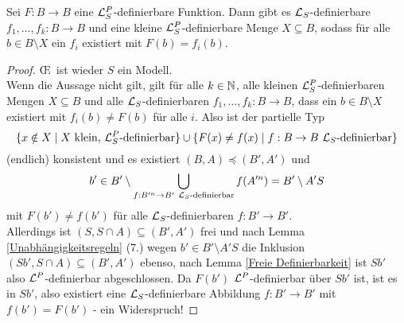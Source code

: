 \begin{lemma}
	Sei $F:B\rightarrow B$ eine $\mathcal{L}^P_S$-definierbare Funktion. Dann gibt es $\mathcal{L}_S$-definierbare $f_1,\dots,f_k:B\rightarrow B$ und eine kleine $\mathcal{L}^P_S$-definierbare Menge $X\subseteq B$, sodass für alle $b\in B\setminus X$ ein $f_i$ existiert mit $F(b)=f_i(b)$.
\end{lemma}
\begin{proof}
	\OE\ ist wieder $S$ ein Modell.\\
	Wenn die Aussage nicht gilt, gilt für alle $k\in\mathbb{N}$, alle kleinen $\mathcal{L}^P_S$-definierbaren Mengen $X\subseteq B$ und alle $\mathcal{L}_S$-definierbaren $f_1,\dots,f_k:B\rightarrow B$, dass ein $b\in B\setminus X$ existiert mit $f_i(b)\neq F(b)$ für alle $i$. Also ist der partielle Typ $$\{x\notin X\mid X\text{ klein, }\mathcal{L}^P_S\text{-definierbar}\}\cup\{F(x)\neq f(x)\mid f:B\rightarrow B\ \mathcal{L}_S\text{-definierbar}\}$$ (endlich) konsistent und es existiert $(B,A)\preceq(B',A')$ und $$b'\in B'\setminus\bigcup\limits_{f:B'^n\rightarrow B'\ \lingua_S\text{-definierbar}}f(A'^n)=B'\setminus A'S$$ mit $F(b')\neq f(b')$ für alle $\mathcal{L}_S$-definierbaren $f:B'\rightarrow B'$.\\
	Allerdings ist $(S,S\cap A)\subseteq(B',A')$ frei und nach Lemma \ref{Unabhängigkeitsregeln} (7.) wegen $b'\in B'\setminus A'S$ die Inklusion $(Sb',S\cap A)\subseteq(B',A')$ ebenso, nach Lemma \ref{Freie Definierbarkeit} ist $Sb'$ also $\mathcal{L}^P$-definierbar abgeschlossen. Da $F(b')$ $\mathcal{L}^P$-definierbar über $Sb'$ ist, ist es in $Sb'$, also existiert eine $\mathcal{L}_S$-definierbare Abbildung $f:B'\rightarrow B'$ mit $f(b')=F(b')$ - ein Widerspruch!
\end{proof}

